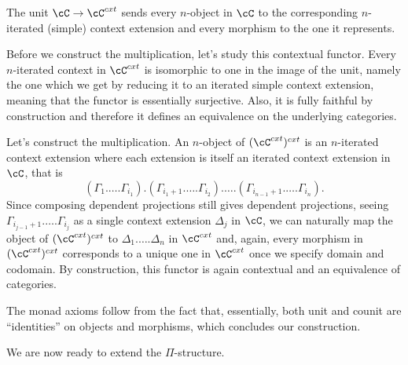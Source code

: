 \documentclass[a4paper,fontsize=12pt]{scrartcl}
\begin{document}
\begin{construction}
  The unit $\cC\rightarrow\cC^{cxt}$ sends every $n$-object in $\cC$ to
  the corresponding $n$-iterated (simple) context extension and every morphism
  to the one it represents.

  Before we construct the multiplication, let's study this contextual functor.
  Every $n$-iterated
  context in $\cC^{cxt}$ is isomorphic to one in the image of the unit, namely
  the one which we get by reducing it to an iterated simple context extension,
  meaning that the functor is essentially surjective. Also, it is fully faithful
  by construction and therefore it defines an equivalence on the underlying
  categories.

  Let's construct the multiplication. An $n$-object of $(\cC^{cxt})^{cxt}$ is an
  $n$-iterated context extension where each extension is itself an iterated
  context extension in $\cC$, that is
  \[(\Gamma_1.\ldots.\Gamma_{i_1}).(\Gamma_{i_1+1}.\ldots.\Gamma_{i_2}).\ldots.(\Gamma_{i_{n-1}+1}.\ldots.\Gamma_{i_n}).\]
  Since composing dependent projections still gives dependent projections,
  seeing $\Gamma_{i_{j-1}+1}.\ldots.\Gamma_{i_j}$ as a single context extension
  $\Delta_j$ in $\cC$, we can naturally
  map the object of $(\cC^{cxt})^{cxt}$ to $\Delta_1.\ldots.\Delta_n$ in
  $\cC^{cxt}$ and, again, every morphism
  in $(\cC^{cxt})^{cxt}$ corresponds to a unique one in $\cC^{cxt}$ once we
  specify domain and codomain. By construction, this functor is again contextual
  and an equivalence of categories.

  The monad axioms follow from the fact that, essentially, both unit and counit
  are ``identities'' on objects and morphisms, which concludes our construction.
\end{construction}

We are now ready to extend the $\Pi$-structure.
\end{document}
